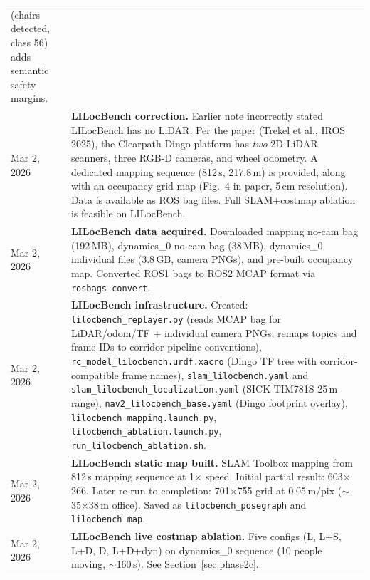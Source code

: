 \documentclass[11pt,a4paper]{article}
\begin{document}
\begin{longtable}{lp{10cm}}
              (chairs detected, class 56) adds semantic safety margins. \\
Mar 2, 2026 & \textbf{LILocBench correction.}  Earlier note incorrectly
              stated LILocBench has no LiDAR.  Per the paper
              (Trekel et al., IROS 2025), the Clearpath Dingo platform has
              \emph{two} 2D LiDAR scanners, three RGB-D cameras, and wheel
              odometry.  A dedicated mapping sequence (812\,s, 217.8\,m) is
              provided, along with an occupancy grid map (Fig.~4 in paper,
              5\,cm resolution).  Data is available as ROS bag files.
              Full SLAM+costmap ablation is feasible on LILocBench. \\
Mar 2, 2026 & \textbf{LILocBench data acquired.}  Downloaded mapping no-cam
              bag (192\,MB), dynamics\_0 no-cam bag (38\,MB), dynamics\_0
              individual files (3.8\,GB, camera PNGs), and pre-built occupancy
              map.  Converted ROS1 bags to ROS2 MCAP format via
              \texttt{rosbags-convert}. \\
Mar 2, 2026 & \textbf{LILocBench infrastructure.}  Created:
              \texttt{lilocbench\_replayer.py} (reads MCAP bag for LiDAR/odom/TF
              + individual camera PNGs; remaps topics and frame IDs to corridor
              pipeline conventions),
              \texttt{rc\_model\_lilocbench.urdf.xacro} (Dingo TF tree with
              corridor-compatible frame names),
              \texttt{slam\_lilocbench.yaml} and
              \texttt{slam\_lilocbench\_localization.yaml} (SICK TIM781S 25\,m range),
              \texttt{nav2\_lilocbench\_base.yaml} (Dingo footprint overlay),
              \texttt{lilocbench\_mapping.launch.py},
              \texttt{lilocbench\_ablation.launch.py},
              \texttt{run\_lilocbench\_ablation.sh}. \\
Mar 2, 2026 & \textbf{LILocBench static map built.}  SLAM Toolbox mapping
              from 812\,s mapping sequence at 1$\times$ speed.  Initial
              partial result: 603$\times$266.  Later re-run to completion:
              701$\times$755 grid at 0.05\,m/pix ($\sim$35$\times$38\,m
              office).  Saved as \texttt{lilocbench\_posegraph} and
              \texttt{lilocbench\_map}. \\
Mar 2, 2026 & \textbf{LILocBench live costmap ablation.}  Five configs
              (L, L+S, L+D, D, L+D+dyn) on dynamics\_0 sequence (10 people
              moving, $\sim$160\,s).  See Section~\ref{sec:phase2c}. \\

\end{longtable}
\end{document}
